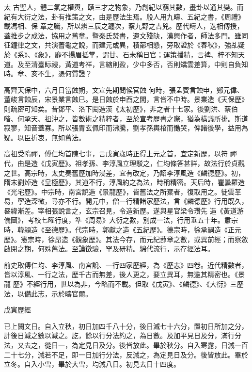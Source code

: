 
\begin{pinyinscope}

 太
 古聖人，體二氣之權輿，賾三才之物象，乃創紀以窮其數，畫卦以通其變。而紀有大衍之法，卦有推策之文，由是歷法生焉。殷人用九疇、五紀之書，《周禮》載馮相、保
 章之職，所以辨三辰之躔次，察九野之吉兇。歷代疇人，迭相傳授，蓋推步之成法，協用之舊章。暨秦氏焚書，遺文殘缺，漢興作者，師法多門。雖同征鐘律之文，共演蓍龜之說，而建元或異，積蔀相懸，旁取證於《春秋》，強乩疑於《系》、《象》，靡不揚眉抵掌，謂甘、石未稱日官；運策播精，言裨、梓不知天道。及至清臺眎祲，黃道考祥，言縮則盈，少中多否，否則矯雲差算，中則自負知時。章、亥不生，憑何質證？



 高齊天保中，六月日當蝕朔，文宣先期問候官蝕
 何時，張孟賓言蝕申，鄭元偉、董峻言蝕辰，宋景業言蝕巳。是日蝕於申酉之間，言皆不中時。景業造《天保歷》則疏密可知矣。昔鄧平、洛下閎造漢《太初歷》，非之者十七家。後劉洪、蔡伯喈、何承天、祖沖之，皆數術之精粹者，至於宣考歷書之際，猶為橫議所排。斯道寂寥，知音蓋寡。所以張胄玄佩印而沸騰，劉孝孫輿棺而慟哭，俾諸後學，益用為疑。以臣折衷，無如舊法。



 高祖受隋禪，傅仁均首陳七事，言戊寅歲時正得上元之首，宜定新歷，以符
 禪代，由是造《戊寅歷》。祖孝孫、李淳風立理駁之，仁均條答甚詳，故法行於貞觀之世。高宗時，太史奏舊歷加時浸差，宜有改定，乃詔李淳風造《麟德歷》。初，隋末劉焯造《皇極歷》，其道不行，淳風約之為法，時稱精密。天后時，瞿曇羅造《光宅歷》。中宗時，南宮說造《景龍歷》，皆舊法之所棄者，復取用之。徒雲革易，寧造深微，尋亦不行。開元中，僧一行精諸家歷法，言《麟德歷》行用既久，晷緯漸差。宰相張說言之，玄宗召見，令造新歷。遂與星官梁令瓚先
 造《黃道游儀圖》，考校七曜行度，準《周易》大衍之數，別成一法，行用垂五十年。肅宗時，韓潁造《至德歷》。代宗時，郭獻之造《五紀歷》。德宗時，徐承嗣造《正元歷》。憲宗時，徐昂造《觀象歷》。其法今存，而元紀蔀章之數，或異前經；而察斂啟閉之期，何殊舊法。至論徵驗，罕及研精。綿代流行，示存經法耳。



 前史取傅仁均、李淳風、南宮說、一行四家歷經，為《歷志》四卷。近代精數者，皆以淳風、一行之法，歷千古而無差，後人更之，要立異耳，無逾其精密也。《景龍
 歷》不經行用，世以為非，今略而不載。但取《戊寅》、《麟德》、《大衍》三歷法，以備此志，示於疇官爾。



 戊寅歷經



 已上闕文日。自入立秋，初日加四千八十分，後日減七十六分，置初日所加之分，計後日減之數以減之。訖，餘以行分法約之，為日數。及加平見日及分，滿行分法，又去之，從日一，為定見日及分。後皆放此。畢於秋分。自入寒露，日減一百二十七分，減若不足，即一日加行分法，反減之，為定見日及分。後皆放此。畢於立冬。自入小雪，畢於大雪，均減八日。初見去日十四度。




\end{pinyinscope}
